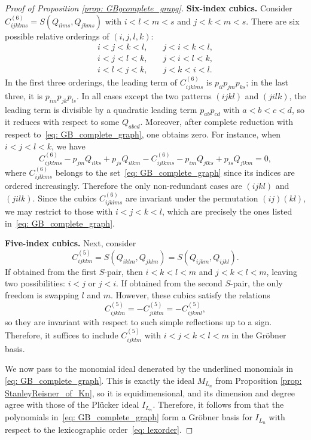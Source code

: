 \documentclass[12pt,a4paper]{amsart}
\theoremstyle{definition}
\begin{document}
\begin{proof}[Proof of Proposition \ref{prop: GBgcomplete_grapg}]
\smallskip
\noindent
\textbf{Six-index cubics.}  
Consider $C^{(6)}_{ijklms} = S(Q_{ilms}, Q_{jkms})$ with $i<l<m<s$ and $j<k<m<s$.  
There are six possible relative orderings of $(i,j,l,k)$:
\begin{align*}
    i <j <k <l, & \quad j <i <k <l,\\
    i <j <l <k, & \quad j <i <l <k,\\
    i <l <j <k, & \quad j< k <i <l.
\end{align*}
In the first three orderings, the leading term of $C^{(6)}_{ijklms}$ is $p_{il}p_{jm}p_{ks}$; in the last three, it is $p_{im}p_{jk}p_{ls}$. In all cases except the two patterns $(ijkl)$ and $(jilk)$, the leading term is divisible by a quadratic leading term $p_{ab}p_{cd}$ with $a<b<c<d$, so it reduces with respect to some $Q_{abcd}$. Moreover, after complete reduction with respect to~\eqref{eq: GB_complete_graph}, one obtains zero. For instance, when $i<j<l<k$, we have
\[
C_{ijklms}^{(6)} - p_{jm}Q_{ilks} + p_{js}Q_{ilkm} - C_{ijlkms}^{(6)} - p_{im}Q_{jlks} + p_{is}Q_{jlkm} = 0,
\]
where $C^{(6)}_{ijlkms}$ belongs to the set~\eqref{eq: GB_complete_graph} since its indices are ordered increasingly.  Therefore the only non-redundant cases are $(ijkl)$ and $(jilk)$.
Since the cubics $C^{(6)}_{ijklms}$ are invariant under the permutation $(ij)(kl)$, we may restrict to those with $i<j<k<l$, which are precisely the ones listed in~\eqref{eq: GB_complete_graph}.  

\smallskip
\noindent
\textbf{Five-index cubics.}  
Next, consider
\[
C^{(5)}_{ijklm} = S(Q_{iklm}, Q_{jklm}) = S(Q_{ijkm}, Q_{ijkl}).
\]
If obtained from the first $S$-pair, then $i<k<l<m$ and $j<k<l<m$, leaving two possibilities: $i<j$ or $j<i$.  
If obtained from the second $S$-pair, the only freedom is swapping $l$ and $m$. However, these cubics satisfy the relations
\[
C^{(5)}_{ijklm} = - C^{(5)}_{jiklm} = - C^{(5)}_{ijkml},
\]
so they are invariant with respect to such simple reflections up to a sign. Therefore, it suffices to include $C^{(5)}_{ijklm}$ with $i<j<k<l<m$ in the Gröbner basis.  

We now pass to the monomial ideal denerated by the underlined monomials in \eqref{eq: GB_complete_graph}. This is exactly the ideal $M_{L_n}$ from Proposition \ref{prop: StanleyReisner_of_Kn}, so it is equidimensional, and its dimension and degree agree with those of the Plücker ideal $I_{L_n}$. Therefore, it follows from \cite[Lemma~3.1]{CHM23} that the polynomials in~\eqref{eq: GB_complete_graph} form a Gröbner basis for $I_{L_n}$ with respect to the lexicographic order~\eqref{eq: lexorder}.
\end{proof}
\end{document}
